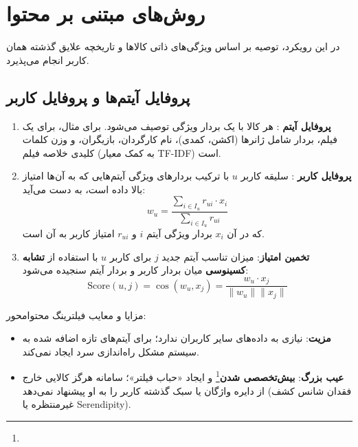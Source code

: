 \section{روش‌های مبتنی بر محتوا \texorpdfstring{}{(Content-Based Recommendation)}}
در این رویکرد، توصیه بر اساس ویژگی‌های ذاتی کالاها و تاریخچه علایق گذشته همان کاربر انجام می‌پذیرد.

\subsection{پروفایل آیتم‌ها و پروفایل کاربر}
\begin{enumerate}
    \item \textbf{پروفایل آیتم }: هر کالا با یک بردار ویژگی توصیف می‌شود. برای مثال، برای یک فیلم، بردار شامل ژانرها (اکشن، کمدی)، نام کارگردان، بازیگران، و وزن کلمات کلیدی خلاصه فیلم (به کمک معیار TF-IDF) است.
    \item \textbf{پروفایل کاربر }: سلیقه کاربر $u$ با ترکیب بردارهای ویژگی آیتم‌هایی که به آن‌ها امتیاز بالا داده است، به دست می‌آید:
    \begin{equation}
    w_u = \frac{\sum_{i \in I_u} r_{ui} \cdot x_i}{\sum_{i \in I_u} r_{ui}}
    \end{equation}
    که در آن $x_i$ بردار ویژگی آیتم $i$ و $r_{ui}$ امتیاز کاربر به آن است.
    \item \textbf{تخمین امتیاز}: میزان تناسب آیتم جدید $j$ برای کاربر $u$ با استفاده از \textbf{تشابه کسینوسی} میان بردار کاربر و بردار آیتم سنجیده می‌شود:
    \begin{equation}
    \text{Score}(u, j) = \cos(w_u, x_j) = \frac{w_u \cdot x_j}{\|w_u\| \|x_j\|}
    \end{equation}
\end{enumerate}

\begin{examnote}
مزایا و معایب فیلترینگ محتوامحور:
\begin{itemize}
    \item \textbf{مزیت}: نیازی به داده‌های سایر کاربران ندارد؛ برای آیتم‌های تازه اضافه شده به سیستم مشکل راه‌اندازی سرد ایجاد نمی‌کند.
    \item \textbf{عیب بزرگ}: \textbf{بیش‌تخصصی شدن}\footnote{} و ایجاد «حباب فیلتر»؛ سامانه هرگز کالایی خارج از دایره واژگان یا سبک گذشته کاربر را به او پیشنهاد نمی‌دهد (فقدان شانس کشف غیرمنتظره یا Serendipity).
\end{itemize}
\end{examnote}

